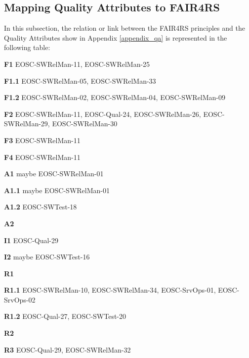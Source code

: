 \subsection{Mapping Quality Attributes to FAIR4RS}

In this subsection, the relation or link between the FAIR4RS principles and the Quality Attributes
show in Appendix \ref{appendix_qa} is represented in the following table:

\textbf{F1} EOSC-SWRelMan-11, EOSC-SWRelMan-25

\textbf{F1.1} EOSC-SWRelMan-05, EOSC-SWRelMan-33

\textbf{F1.2} EOSC-SWRelMan-02, EOSC-SWRelMan-04, EOSC-SWRelMan-09

\textbf{F2} EOSC-SWRelMan-11, EOSC-Qual-24, EOSC-SWRelMan-26, EOSC-SWRelMan-29, EOSC-SWRelMan-30

\textbf{F3} EOSC-SWRelMan-11

\textbf{F4} EOSC-SWRelMan-11


\textbf{A1} maybe EOSC-SWRelMan-01

\textbf{A1.1} maybe EOSC-SWRelMan-01

\textbf{A1.2} EOSC-SWTest-18

\textbf{A2}

\textbf{I1} EOSC-Qual-29

\textbf{I2} maybe EOSC-SWTest-16

\textbf{R1}

\textbf{R1.1} EOSC-SWRelMan-10, EOSC-SWRelMan-34, EOSC-SrvOps-01, EOSC-SrvOps-02

\textbf{R1.2} EOSC-Qual-27, EOSC-SWTest-20

\textbf{R2}

\textbf{R3} EOSC-Qual-29, EOSC-SWRelMan-32




